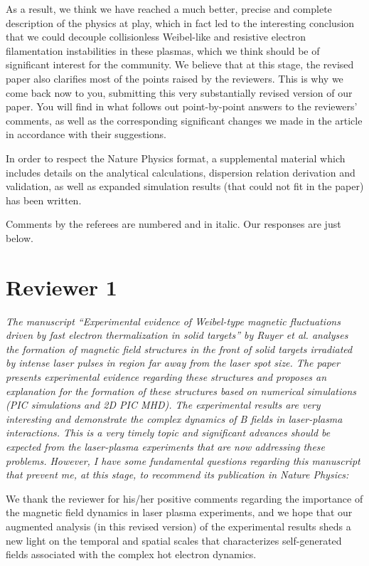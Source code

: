 \documentclass{article}
\begin{document}
As a result, we think we have reached a much better, precise and complete description of the physics at play, which in fact led to the interesting conclusion that we could decouple collisionless Weibel-like and resistive electron filamentation instabilities in these plasmas, which we think should be of significant interest for the community. We believe that at this stage, the revised paper also clarifies most of the points raised by the reviewers. 
This is why we come back now to you, submitting this very substantially revised version of our paper. You will find in what follows out point-by-point answers to the reviewers’ comments, as well as the corresponding significant changes we made in the article in accordance with their suggestions.

In order to respect the Nature Physics format, a supplemental material which includes details on the analytical calculations, dispersion relation derivation and validation, as well as expanded simulation results (that could not fit in the paper) has been written.

Comments by the referees are numbered and in italic. Our responses are just below.


\section{Reviewer 1 }

\textit{
The manuscript “Experimental evidence of Weibel-type magnetic fluctuations driven by fast electron thermalization in solid targets” by Ruyer et al. analyses the formation of magnetic field structures in the front of solid targets irradiated by intense laser pulses in region far away from the laser spot size. The paper presents experimental evidence regarding these structures and proposes an explanation for the formation of these structures based on numerical simulations (PIC simulations and 2D PIC MHD). The experimental results are very interesting and demonstrate the complex dynamics of B fields in laser-plasma interactions. This is a very timely topic and significant advances should be expected from the laser-plasma experiments that are now addressing these problems.
However, I have some fundamental questions regarding this manuscript that prevent me, at this stage, to recommend its publication in Nature Physics:
}

We thank the reviewer for his/her positive comments regarding  the importance of the magnetic field dynamics in laser plasma experiments, and we hope that our  augmented analysis (in this revised version) of the experimental results sheds a new light on the temporal and spatial scales that characterizes self-generated fields associated with the complex hot electron dynamics.
\end{document}
